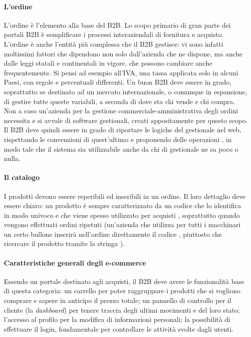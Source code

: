 \paragraph{L'ordine}
L'ordine è l'elemento alla base del B2B. Lo scopo primario di gran parte dei portali B2B è semplificare i processi interaziendali di fornitura e acquisto. L'ordine è anche l'entità più complessa che il B2B gestisce: vi sono infatti moltissimi fattori che dipendono non solo dall'azienda che ne dispone, ma anche dalle leggi statali e continentali in vigore, che possono cambiare anche frequentemente. Si pensi ad esempio all'\Gls{IVA}, una tassa applicata solo in alcuni Paesi, con regole e percentuali differenti. Un buon B2B deve essere in grado, soprattutto se destinato ad un mercato internazionale, o comunque in espansione, di gestire tutte queste variabili, a seconda di dove sta chi vende e chi compra. Non a caso un'azienda per la gestione commerciale-amministrativa degli ordini necessita e si avvale di software gestionali, creati appositamente per questo scopo. Il B2B deve quindi essere in grado di riportare le logiche del gestionale nel web, rispettando le convenzioni di quest'ultimo e proponendo delle operazioni , in modo tale che il sistema sia utilizzabile anche da chi di gestionale ne sa poco o nulla.

\paragraph{Il catalogo}
I prodotti devono essere reperibili ed inseribili in un ordine. Il loro dettaglio deve essere chiaro: un prodotto è sempre caratterizzato da un codice che lo identifica in modo univoco e che viene spesso utilizzato per acquisti , soprattutto quando vengono effettuati ordini ripetuti (un'azienda che utilizza per tutti i macchinari un certo bullone inserirà nell'ordine direttamente il codice , piuttosto che ricercare il prodotto tramite la stringa ).

\paragraph{Caratteristiche generali degli e-commerce}
Essendo un portale destinato agli acquisti, il B2B deve avere le funzionalità base di questa categoria: un carrello per poter raggruppare i prodotti che si vogliono comprare e sapere in anticipo il prezzo totale; un pannello di controllo per il cliente (la \textit{dashboard}) per tenere traccia degli ultimi movimenti e del loro stato; l'accesso al profilo per la modifica di informazioni personali; la possibilità di effettuare il login, fondamentale per controllare le attività svolte dagli utenti.

